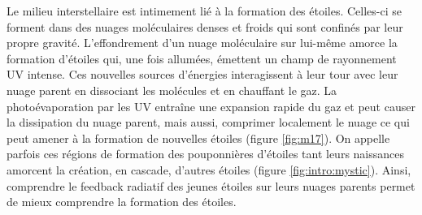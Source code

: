 \documentclass[11pt,a4paper]{article}
\begin{document}
\begin{spacing}{0.98}
Le milieu interstellaire est intimement lié à la formation des étoiles. Celles-ci se forment dans des nuages moléculaires denses et froids qui sont confinés par leur propre gravité. L'effondrement d'un nuage moléculaire sur lui-même amorce la formation d'étoiles qui, une fois allumées, émettent un champ de rayonnement UV intense. Ces nouvelles sources d'énergies interagissent à leur tour avec leur nuage parent en dissociant les molécules et en chauffant le gaz. La photoévaporation par les UV entraîne une expansion rapide du gaz et peut causer la dissipation du nuage parent, mais aussi, comprimer localement le nuage ce qui peut amener à la formation de nouvelles étoiles (figure \ref{fig:m17}). On appelle parfois ces régions de formation des \og pouponnières d'étoiles \fg{} tant leurs naissances amorcent la création, en cascade, d'autres étoiles (figure \ref{fig:intro:mystic}). Ainsi, comprendre le feedback radiatif des jeunes étoiles sur leurs nuages parents permet de mieux comprendre la formation des étoiles. \newline 



\end{spacing}
\end{document}
